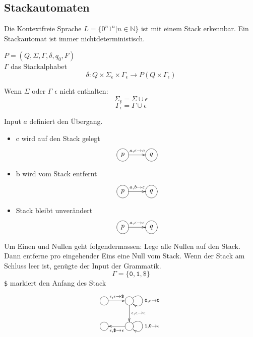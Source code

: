 \documentclass[a4paper]{article}
\begin{document}
\subsection{Stackautomaten}
	\begin{multicols}{2}
	
	Die Kontextfreie Sprache $L = \{0^n1^n | n \in \mathbb{N}\}$ ist mit einem Stack erkennbar. 
	Ein Stackautomat ist immer nichtdeterministisch.
	\begin{fdef}[Stackautomat]
		$P = (Q, \Sigma, \Gamma, \delta, q_0, F)$  \\
		$\Gamma$ das Stackalphabet \\
		$$\delta: Q \times \Sigma_\epsilon \times \Gamma_\epsilon \longrightarrow P(Q \times \Gamma_\epsilon)$$

		Wenn $\Sigma$ oder $\Gamma$ $\epsilon$ nicht enthalten:
		$$\Sigma_{\epsilon} = \Sigma \cup \epsilon$$
		$$\Gamma_{\epsilon} = \Gamma \cup \epsilon$$
	\end{fdef}
	
	\begin{fmerke}
	Input $a$ definiert den Übergang.
	\begin{itemize}
		\item c wird auf den Stack gelegt
		      \[ \entrymodifiers={++[o][F]}
		         \xymatrix{   p \ar[r]^{a,\epsilon \rightarrow c} & q   } \]

		\item b wird vom Stack entfernt
		      \[ \entrymodifiers={++[o][F]}
		         \xymatrix{   p \ar[r]^{a,b \rightarrow \epsilon} & q   } \]

		\item Stack bleibt unverändert
		      \[ \entrymodifiers={++[o][F]}
		         \xymatrix{   p \ar[r]^{a,\epsilon \rightarrow \epsilon} & q   } \]
	\end{itemize}
	\end{fmerke}
	
	\begin{fmerke}[Beispiel $L=\{0^n1^n | n \in \mathbb{N}\}$]
	Um Einen und Nullen geht folgendermassen: Lege alle Nullen auf den Stack. Dann entferne pro eingehender Eins eine Null vom Stack. Wenn der Stack am Schluss leer ist, genügte der Input der Grammatik.\\
	$$\Gamma = \{ \texttt{0}, \texttt{1}, \texttt{\$} \}$$
	\texttt{\$} markiert den Anfang des Stack
	\[ \entrymodifiers={++[o][F]}
	   \xymatrix{   \ar[r]^{\epsilon,\epsilon \rightarrow \texttt{\$}} & \ar@(ur,dr)^{\texttt{0}, \epsilon \rightarrow \texttt{0}} \ar[d]^{\epsilon, \epsilon \rightarrow \epsilon} \\
	   	            & \ar[l]^{\epsilon, \texttt{\$} \rightarrow \epsilon} \ar@(ur,dr)^{\texttt{1}, \texttt{0} \rightarrow \epsilon}
	} \]
	\end{fmerke}
	\end{multicols}
\end{document}
